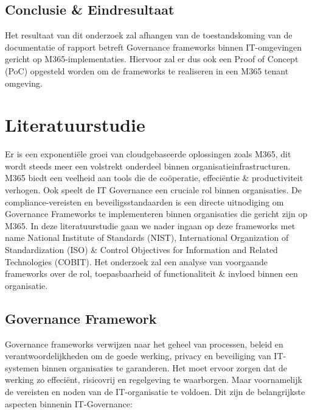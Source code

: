 \subsection{Conclusie \& Eindresultaat}
Het resultaat van dit onderzoek zal afhangen van de toestandskoming van de documentatie of rapport betreft Governance frameworks binnen IT-omgevingen gericht op M365-implementaties. Hiervoor zal er dus ook een Proof of Concept (PoC) opgesteld worden om de frameworks te realiseren in een M365 tenant omgeving.



\section{Literatuurstudie}%
\label{sec:Literatuurstudie}

Er is een exponentiële groei van cloudgebaseerde oplossingen zoals M365, dit wordt steeds meer een volstrekt onderdeel binnen organisatieinfrastructuren. M365 biedt een veelheid aan tools die de coöperatie, effeciëntie \& productiviteit verhogen. Ook speelt de IT Governance een cruciale rol binnen organisaties. 
De compliance-vereisten en beveiligsstandaarden is een directe uitnodiging om Governance Frameworks te implementeren binnen organisaties die gericht zijn op M365.
In deze literatuurstudie gaan we nader ingaan op deze frameworks met name National Institute of Standards (NIST), International Organization of Standardization (ISO) \& Control Objectives for Information and Related Technologies (COBIT). Het onderzoek zal een analyse van voorgaande frameworks over de rol, toepasbaarheid of functionaliteit \& invloed binnen een organisatie.

\subsection{Governance Framework}
Governance frameworks verwijzen naar het geheel van processen, beleid en verantwoordelijkheden om de goede werking, privacy en beveiliging van IT-systemen binnen organisaties te garanderen. Het moet ervoor zorgen dat de werking zo effeciënt, risicovrij en regelgeving te waarborgen. Maar voornamelijk de vereisten en noden van de IT-organisatie te voldoen. Dit zijn de belangrijkste aspecten binnenin IT-Governance:

